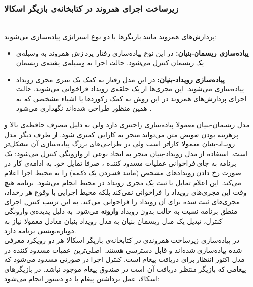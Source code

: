 \subsubsection{ زیرساخت اجرای همروند در کتابخانه‌ی بازیگر اسکالا}\\
\label{ref:receive_react}
پردازش‌های همروند مانند بازیگر‌ها با دو نوع استراتژی پیاده‌سازی می‌شوند:
\begin{itemize}
\item \textbf{پیاده‌سازی \gls{ریسمان-بنیان}:}
در این نوع پیاده‌سازی رفتار پردازش همروند به وسیله‌ی یک ریسمان کنترل می‌شود. حالت اجرا به وسیله‌ی  \gls{پشته}‌ی ریسمان\cite{concurrent_prog_java}

\item \textbf{پیاده‌سازی \gls{رویداد-بنیان}:}
در این مدل رفتار به کمک یک سری \gls{مجری رویداد} پیاده‌سازی می‌شوند. این مجری‌ها از یک حلقه‌ی رویداد فراخوانی می‌شوند. حالت اجرای پردازش‌های همروند در این روش به کمک رکورد‌ها یا اشیاء مشخصی که به همین منظور طراحی شده‌اند نگهداری می‌شود \cite{SEDA}.
\end{itemize}
مدل ریسمان-بنیان معمولا پیاده‌سازی راحتتری دارد ولی به دلیل مصرف حافظه‌ی بالا و پرهزینه بودن \gls{تعویض متن} می‌تواند منجر به کارایی کمتری شود\cite{WhyThreadsAreABadIdea}. از طرف دیگر مدل رویداد-بنیان معمولا کاراتر است ولی در طراحی‌های بزرگ پیاده‌سازی آن مشکل‌تر است\cite{whyevents}.
استفاده از مدل رویداد-بنیان منجر به ایجاد نوعی از \gls{وارونگی کنترل} می‌شود: یک برنامه به جای فراخوانی عملیات \gls{مسدود کننده} ، صرفا تمایل خود به ادامه‌ی کار در صورت رخ دادن رویدادهای مشخص (مانند فشردن یک دکمه) را به محیط اجرا اعلام می‌کند. این اعلام تمایل با ثبت یک مجری رویداد در محیط انجام می‌شود. برنامه هیچ وقت این مجری‌های رویداد را فراخوانی نمی‌کند بلکه محیط اجرایی با وقوع هر رخداد، مجری‌های ثبت شده برای آن رویداد را فراخوانی می‌کند. به این ترتیب کنترل اجرای منطق برنامه نسبت به حالت بدون رویداد \textbf{وارونه} می‌شود. به دلیل پدیده‌ی وارونگی کنترل، تبدیل یک مدل ریسمان-بنیان به مدل رویداد-بنیان معادل معمولا نیاز به دوباره‌نویسی برنامه دارد\cite{responders2006}.
\\
در پیاده‌سازی زیرساخت همروندی در کتابخانه‌ی بازیگر اسکالا هر دو رویکرد معرفی شده پیاده‌سازی شده‌اند و قابل دسترسی هستند. اصلی‌ترین عمیات مسدود کننده در مدل اکتور انتظار برای دریافت پیغام است. کنترل اجرا در صورتی مسدود می‌شود که پیغامی که بازیگر منتظر دریافت آن است در صندوق پیغام موجود نباشد. در بازیگر‌های اسکالا، عمل برداشتن پیغام با دو دستور انجام می‌شود:

